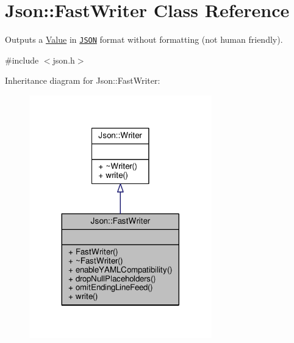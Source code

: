 \hypertarget{classJson_1_1FastWriter}{}\section{Json\+:\+:Fast\+Writer Class Reference}
\label{classJson_1_1FastWriter}


Outputs a \hyperlink{classJson_1_1Value}{Value} in \href{http://www.json.org}{\tt J\+S\+ON} format without formatting (not human friendly).  




{\ttfamily \#include $<$json.\+h$>$}



Inheritance diagram for Json\+:\+:Fast\+Writer\+:
\nopagebreak
\begin{figure}[H]
\begin{center}
\leavevmode
\includegraphics[width=224pt]{d3/d3e/classJson_1_1FastWriter__inherit__graph}
\end{center}
\end{figure}


